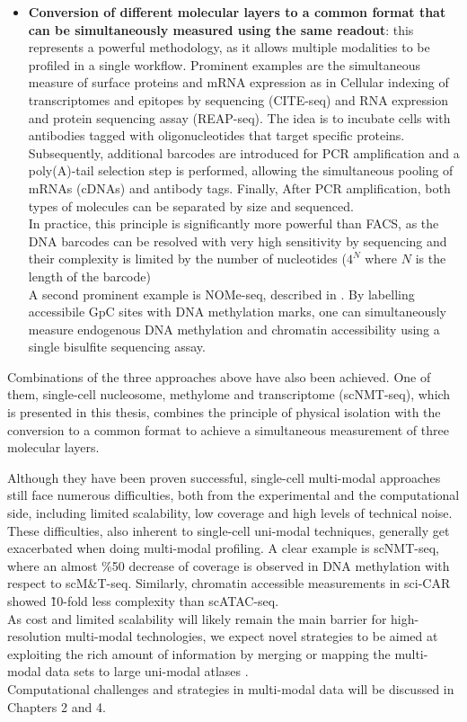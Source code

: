 \begin{itemize}
	\item \textbf{Conversion of different molecular layers to a common format that can be simultaneously measured using the same readout}: this represents a powerful methodology, as it allows multiple modalities to be profiled in a single workflow. Prominent examples are the simultaneous measure of surface proteins and mRNA expression as in Cellular indexing of transcriptomes and epitopes by sequencing (CITE-seq\cite{Stoeckius2017}) and RNA expression and protein sequencing assay (REAP-seq\cite{Peterson2017}). The idea is to incubate cells with antibodies tagged with oligonucleotides that target specific proteins. Subsequently, additional barcodes are introduced for PCR amplification and a poly(A)-tail selection step is performed, allowing the simultaneous pooling of mRNAs (cDNAs) and antibody tags. Finally, After PCR amplification, both types of molecules can be separated by size and sequenced.\\
	In practice, this principle is significantly more powerful than FACS, as the DNA barcodes can be resolved with very high sensitivity by sequencing and their complexity is limited by the number of nucleotides ($4^N$ where $N$ is the length of the barcode)\\
	A second prominent example is NOMe-seq, described in . By labelling accessibile GpC sites with DNA methylation marks, one can simultaneously measure endogenous DNA methylation and chromatin accessibility using a single bisulfite sequencing assay.
\end{itemize}
Combinations of the three approaches above have also been achieved. One of them, single-cell nucleosome, methylome and transcriptome (scNMT-seq\cite{Clark2018}), which is presented in this thesis, combines the principle of physical isolation with the conversion to a common format to achieve a simultaneous measurement of three molecular layers.

Although they have been proven successful, single-cell multi-modal approaches still face numerous difficulties, both from the experimental and the computational side, including limited scalability, low coverage and high levels of technical noise. These difficulties, also inherent to single-cell uni-modal techniques, generally get exacerbated when doing multi-modal profiling. A clear example is scNMT-seq, where an almost \%50 decrease of coverage is observed in DNA methylation with respect to scM\&T-seq. Similarly, chromatin accessible measurements in sci-CAR\cite{Cao2018a} showed \~10-fold less complexity than scATAC-seq.\\
As cost and limited scalability will likely remain the main barrier for high-resolution multi-modal technologies, we expect novel strategies to be aimed at exploiting the rich amount of information by merging or mapping the multi-modal data sets to large uni-modal atlases \cite{Aviv2017,Cao2019,Cusanovich2018b,Pijuan-Sala2019}.\\
Computational challenges and strategies in multi-modal data will be discussed in Chapters 2 and 4.



